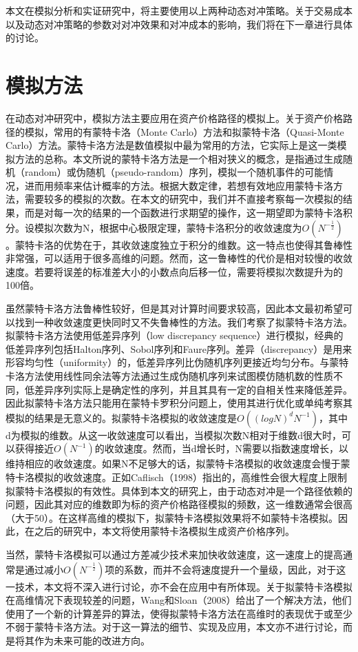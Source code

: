 本文在模拟分析和实证研究中，将主要使用以上两种动态对冲策略。关于交易成本以及动态对冲策略的参数对对冲效果和对冲成本的影响，我们将在下一章进行具体的讨论。

\section{模拟方法}

在动态对冲研究中，模拟方法主要应用在资产价格路径的模拟上。关于资产价格路径的模拟，常用的有蒙特卡洛（Monte Carlo）方法和拟蒙特卡洛（Quasi-Monte Carlo）方法。蒙特卡洛方法是数值模拟中最为常用的方法，它实际上是这一类模拟方法的总称。本文所说的蒙特卡洛方法是一个相对狭义的概念，是指通过生成随机（random）或伪随机（pseudo-random）序列，模拟一个随机事件的可能情况，进而用频率来估计概率的方法。根据大数定律，若想有效地应用蒙特卡洛方法，需要较多的模拟的次数。在本文的研究中，我们并不直接考察每一次模拟的结果，而是对每一次的结果的一个函数进行求期望的操作，这一期望即为蒙特卡洛积分。设模拟次数为N，根据中心极限定理，蒙特卡洛积分的收敛速度为$O(N^{-\frac{1}{2}})$。蒙特卡洛的优势在于，其收敛速度独立于积分的维数。这一特点也使得其鲁棒性非常强，可以适用于很多高维的问题。然而，这一鲁棒性的代价是相对较慢的收敛速度。若要将误差的标准差大小的小数点向后移一位，需要将模拟次数提升为的100倍。

虽然蒙特卡洛方法鲁棒性较好，但是其对计算时间要求较高，因此本文最初希望可以找到一种收敛速度更快同时又不失鲁棒性的方法。我们考察了拟蒙特卡洛方法。拟蒙特卡洛方法使用低差异序列（low discrepancy sequence）进行模拟，经典的低差异序列包括Halton序列、Sobol序列和Faure序列。差异（discrepancy）是用来形容均匀性（uniformity）的，低差异序列比伪随机序列更接近均匀分布。与蒙特卡洛方法使用线性同余法等方法通过生成伪随机序列来试图模仿随机数的性质不同，低差异序列实际上是确定性的序列，并且其具有一定的自相关性来降低差异。因此拟蒙特卡洛方法只能用在蒙特卡罗积分问题上，使用其进行优化或单纯考察其模拟的结果是无意义的。拟蒙特卡洛模拟的收敛速度是$O((logN)^{d}N^{-1})$，其中d为模拟的维数。从这一收敛速度可以看出，当模拟次数N相对于维数d很大时，可以获得接近$O(N^{-1})$的收敛速度。然而，当d增长时，N需要以指数速度增长，以维持相应的收敛速度。如果N不足够大的话，拟蒙特卡洛模拟的收敛速度会慢于蒙特卡洛模拟的收敛速度。正如Caflisch（1998）指出的，高维性会很大程度上限制拟蒙特卡洛模拟的有效性。具体到本文的研究上，由于动态对冲是一个路径依赖的问题，因此其对应的维数即为标的资产价格路径模拟的频数，这一维数通常会很高（大于50）。在这样高维的模拟下，拟蒙特卡洛模拟效果将不如蒙特卡洛模拟。因此，在之后的研究中，本文将使用蒙特卡洛模拟生成资产价格序列。

当然，蒙特卡洛模拟可以通过方差减少技术来加快收敛速度，这一速度上的提高通常是通过减小$O(N^{-\frac{1}{2}})$项的系数，而并不会将速度提升一个量级，因此，对于这一技术，本文将不深入进行讨论，亦不会在应用中有所体现。关于拟蒙特卡洛模拟在高维情况下表现较差的问题，Wang和Sloan（2008）给出了一个解决方法，他们使用了一个新的计算差异的算法，使得拟蒙特卡洛方法在高维时的表现优于或至少不弱于蒙特卡洛方法。对于这一算法的细节、实现及应用，本文亦不进行讨论，而是将其作为未来可能的改进方向。

